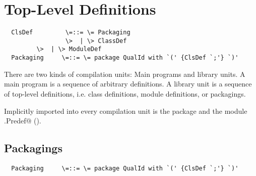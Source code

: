 \documentclass[11pt]{report}
\begin{document}
\chapter{Top-Level Definitions}
\label{sec:topdefs}

\syntax\begin{verbatim}
  ClsDef         \=::= \= Packaging
                 \>  | \> ClassDef
		 \>  | \> ModuleDef
  Packaging     \=::= \= package QualId with `(' {ClsDef `;'} `)'
\end{verbatim}

There are two kinds of compilation units: Main programs and library
units. A main program is a sequence of arbitrary definitions. A
library unit is a sequence of top-level definitions, i.e. class
definitions, module definitions, or packagings.

Implicitly imported into every compilation unit is the package
\verb@scala@ and the module \verb@scala.Predef@ ().

\section{Packagings}

\syntax\begin{verbatim}
  Packaging     \=::= \= package QualId with `(' {ClsDef `;'} `)'
\end{verbatim}
\end{document}
